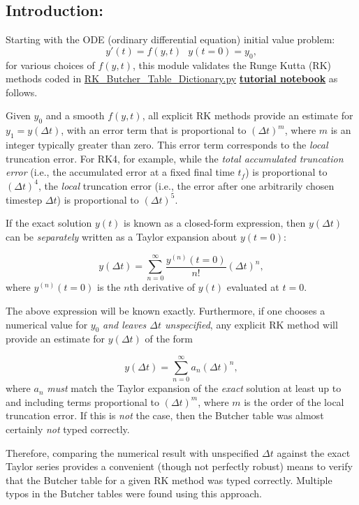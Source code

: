 \documentclass[landscape,letterpaper,10pt,english]{article}
\begin{document}
\hypertarget{introduction}{%
\subsection{Introduction:}\label{introduction}}

Starting with the ODE (ordinary differential equation) initial value
problem: \[
y'(t) = f(y,t)\ \ \ y\left(t=0\right)=y_0,
\] for various choices of \(f(y,t)\), this module validates the Runge
Kutta (RK) methods coded in
\href{../edit/MoLtimestepping/RK_Butcher_Table_Dictionary.py}{RK\_Butcher\_Table\_Dictionary.py}
\href{Tutorial-RK_Butcher_Table_Dictionary.ipynb}{\textbf{tutorial
notebook}} as follows.

Given \(y_0\) and a smooth \(f(y,t)\), all explicit RK methods provide
an estimate for \(y_1 = y\left(\Delta t\right)\), with an error term
that is proportional to \(\left(\Delta t\right)^m\), where \(m\) is an
integer typically greater than zero. This error term corresponds to the
\emph{local} truncation error. For RK4, for example, while the
\emph{total accumulated truncation error} (i.e., the accumulated error
at a fixed final time \(t_f\)) is proportional to
\(\left(\Delta t\right)^4\), the \emph{local} truncation error (i.e.,
the error after one arbitrarily chosen timestep \(\Delta t\)) is
proportional to \(\left(\Delta t\right)^5\).

If the exact solution \(y(t)\) is known as a closed-form expression,
then \(y\left(\Delta t\right)\) can be \emph{separately} written as a
Taylor expansion about \(y(t=0)\):

\[
y\left(\Delta t\right) = \sum_{n=0}^\infty \frac{y^{(n)}(t=0)}{n!} \left(\Delta t\right)^n,
\] where \(y^{(n)}(t=0)\) is the \(n\)th derivative of \(y(t)\)
evaluated at \(t=0\).

The above expression will be known exactly. Furthermore, if one chooses
a numerical value for \(y_0\) \emph{and leaves \(\Delta t\)
unspecified}, any explicit RK method will provide an estimate for
\(y\left(\Delta t\right)\) of the form

\[
y\left(\Delta t\right) = \sum_{n=0}^\infty a_n \left(\Delta t\right)^n,
\] where \(a_n\) \emph{must} match the Taylor expansion of the
\emph{exact} solution at least up to and including terms proportional to
\(\left(\Delta t\right)^m\), where \(m\) is the order of the local
truncation error. If this is \emph{not} the case, then the Butcher table
was almost certainly \emph{not} typed correctly.

Therefore, comparing the numerical result with unspecified \(\Delta t\)
against the exact Taylor series provides a convenient (though not
perfectly robust) means to verify that the Butcher table for a given RK
method was typed correctly. Multiple typos in the Butcher tables were
found using this approach.
\end{document}

